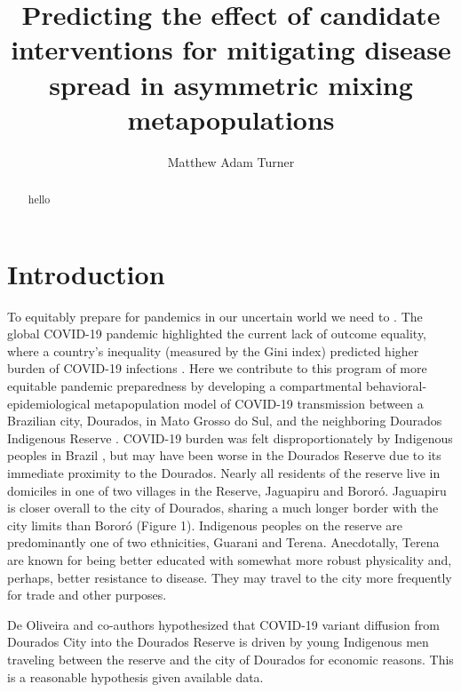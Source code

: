 \documentclass[
  letterpaper,
  abstract]{scrartcl}
\title{Predicting the effect of candidate interventions for mitigating
disease spread in asymmetric mixing metapopulations}
\author{Matthew Adam Turner}
\date{}
\renewcommand*\contentsname{Table of contents}
\newcommand\contentsname{Table of contents}
\begin{document}
\maketitle
\begin{abstract}
\noindent hello
\end{abstract}

\renewcommand*\contentsname{Table of contents}
{
\hypersetup{linkcolor=}
\setcounter{tocdepth}{3}
\tableofcontents
}
\section{Introduction}\label{introduction}

To equitably prepare for pandemics in our uncertain world we need to
\autocite{Rodo2021,Adashi2022}. The global COVID-19 pandemic highlighted
the current lack of outcome equality, where a country's inequality
(measured by the Gini index) predicted higher burden of COVID-19
infections \autocite{Su2022}. Here we contribute to this program of more
equitable pandemic preparedness by developing a compartmental
behavioral-epidemiological metapopulation model of COVID-19 transmission
between a Brazilian city, Dourados, in Mato Grosso do Sul, and the
neighboring Dourados Indigenous Reserve \autocite{DeOliveira2023}.
COVID-19 burden was felt disproportionately by Indigenous peoples in
Brazil \autocite{Simionatto2020}, but may have been worse in the
Dourados Reserve due to its immediate proximity to the Dourados. Nearly
all residents of the reserve live in domiciles in one of two villages in
the Reserve, Jaguapiru and Bororó. Jaguapiru is closer overall to the
city of Dourados, sharing a much longer border with the city limits than
Bororó (Figure 1). Indigenous peoples on the reserve are predominantly
one of two ethnicities, Guarani and Terena. Anecdotally, Terena are
known for being better educated with somewhat more robust physicality
and, perhaps, better resistance to disease. They may travel to the city
more frequently for trade and other purposes.

De Oliveira and co-authors hypothesized that COVID-19 variant diffusion
from Dourados City into the Dourados Reserve is driven by young
Indigenous men traveling between the reserve and the city of Dourados
for economic reasons. This is a reasonable hypothesis given available
data.
\end{document}
